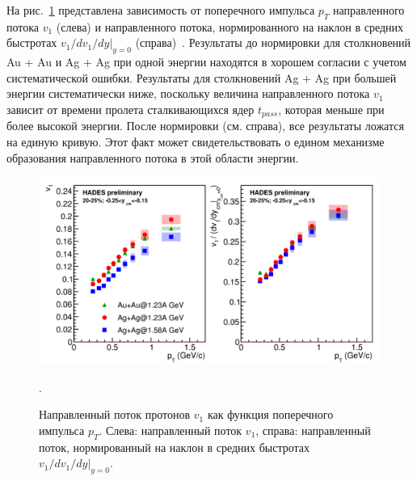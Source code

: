 На рис.~\ref{fig:v1_pT_scaling} представлена зависимость от поперечного импульса $p_T$ направленного потока $v_1$ (слева) и направленного потока, нормированного на наклон в средних быстротах $v_1/dv_1/dy|_{y=0}$ (справа)~\cite{Mamaev:2024-1,Mamaev:2024-2}.
Результаты до нормировки для столкновений Au + Au и Ag + Ag при одной энергии находятся в хорошем согласии с учетом систематической ошибки.
Результаты для столкновений Ag + Ag при большей энергии систематически ниже, поскольку величина направленного потока $v_1$ зависит от времени пролета сталкивающихся ядер $t_{pass}$, которая меньше при более высокой энергии.
После нормировки (см. справа), все результаты ложатся на единую кривую.
Этот факт может свидетельствовать о едином механизме образования направленного потока в этой области энергии.
\begin{figure}[ht]
\begin{center}
\includegraphics[width=0.9\linewidth]{images/v1_hades_pT_scaling.png}
\caption{ 
    Направленный поток протонов $v_1$ как функция поперечного импульса $p_T$. Слева: направленный поток $v_1$, справа: направленный поток, нормированный на наклон в средних быстротах $v_1/dv_1/dy|_{y=0}$.
}.
\label{fig:v1_pT_scaling}
\end{center}
\end{figure}

